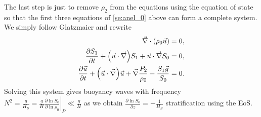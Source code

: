 \documentclass[11pt,
        usenames, %
        dvipsnames %
    ]{article}
\newcommand*{\pd}[2]{\frac{\partial#1}{\partial#2}}
\newcommand*{\at}[1]{\left.#1\right|}
\DeclarePairedDelimiter\p{\lparen}{\rparen}
\begin{document}
The last step is just to remove $\rho_2$ from the equations using the equation
of state so that the first three equations of \autoref{se:anel_0} above can form
a complete system. We simply follow Glatzmaier and rewrite
\begin{subequations}\label{se:anel_f}
    \begin{align}
        \vec{\nabla} \cdot \p*{\rho_0 \vec{u}} &= 0,\\
        \pd{S_1}{t} + \p*{\vec{u} \cdot \vec{\nabla}}S_1 + \vec{u} \cdot
            \vec{\nabla}S_0 &= 0,\\
        \pd{\vec{u}}{t} + \p*{\vec{u} \cdot \vec{\nabla}}\vec{u} +
            \vec{\nabla}\frac{P_2}{\rho_0} - \frac{S_1\vec{g}}{S_0} &= 0.
    \end{align}
\end{subequations}
Solving this system gives buoyancy waves with frequency $N^2 =
\frac{g}{H_S} = \frac{g}{H} \at{\pd{\ln S_0}{\ln \rho_0}}_P \ll \frac{g}{H}$ as
we obtain $\pd{\ln S_0}{z} = -\frac{1}{H_S}$ stratification using the EoS.
\end{document}
